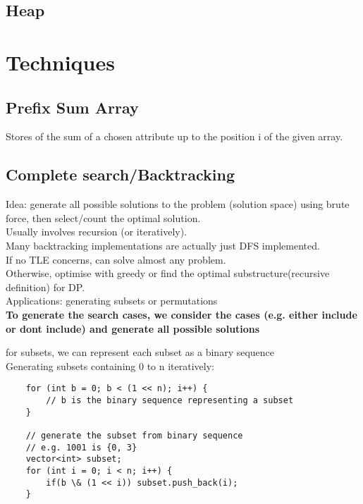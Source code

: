 \documentclass[12pt]{article}
\begin{document}
\subsection{Heap} 

\section{Techniques} 

\subsection{Prefix Sum Array} 
Stores of the sum of a chosen attribute up to the position i of the given array. 

\subsection{Complete search/Backtracking} 
Idea: generate all possible solutions to the problem (solution space) using brute force, then select/count the optimal solution.  \\ 
Usually involves recursion (or iteratively). \\ 
Many backtracking implementations are actually just DFS implemented. \\

If no TLE concerns, can solve almost any problem. \\ 
Otherwise, optimise with greedy or find the optimal substructure(recursive definition) for DP.  \\ 

Applications: generating subsets or permutations \\ 

{\textbf{To generate the search cases, we consider the cases (e.g. either include or dont include) and generate all possible solutions}} 

for subsets, we can represent each subset as a binary sequence  \\ 
\noindent Generating subsets containing 0 to n iteratively: 
\begin{verbatim} 
	for (int b = 0; b < (1 << n); i++) {
		// b is the binary sequence representing a subset
	} 

	// generate the subset from binary sequence 
	// e.g. 1001 is {0, 3} 
	vector<int> subset; 
	for (int i = 0; i < n; i++) {
		if(b \& (1 << i)) subset.push_back(i); 
	}
\end{verbatim}  
\end{document}
